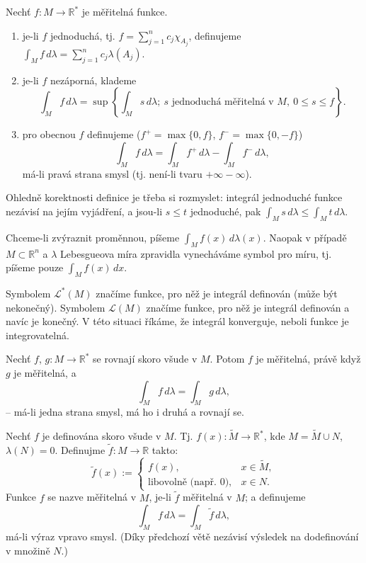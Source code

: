 \begin{definice}
Nechť $f : M \to \mathbb{R}^*$ je měřitelná funkce.
\begin{enumerate}[1.]
\item je-li $f$ jednoduchá, tj.
$f = \sum_{j=1}^n c_j \chi_{A_j}$, definujeme
$\int_M f \, d\lambda = \sum_{j=1}^n c_j \lambda(A_j)$.
\item je-li $f$ nezáporná, klademe
\[
\int_M f \, d\lambda = \sup \left\{ \int_M s \, d\lambda;
\ s \text{ jednoduchá měřitelná v } M, \ 0 \le s \le f \right\}.
\]
\item pro obecnou $f$ definujeme
($f^+ = \max\{0, f\}$, $f^- = \max\{0, -f\}$)
\[
\int_M f \, d\lambda = \int_M f^+ \, d\lambda - \int_M f^- \, d\lambda,
\]
má-li pravá strana smysl (tj. není-li tvaru $+\infty - \infty$).
\end{enumerate}
\end{definice}

\begin{poznamka}
Ohledně korektnosti definice je třeba si rozmyslet: integrál jednoduché
funkce nezávisí na jejím vyjádření, a jsou-li $s \le t$ jednoduché,
pak $\int_M s \, d\lambda \le \int_M t \, d\lambda$.
\end{poznamka}

\begin{poznamka}
Chceme-li zvýraznit proměnnou, píšeme $\int_M f(x) \, d\lambda(x)$.
Naopak v případě $M \subset \mathbb{R}^n$ a $\lambda$ Lebesgueova míra
zpravidla vynecháváme symbol pro míru, tj. píšeme pouze
$\int_M f(x) \, dx$.

Symbolem $\mathcal{L}^*(M)$ značíme funkce, pro něž je integrál
definován (může být nekonečný). Symbolem $\mathcal{L}(M)$ značíme
funkce, pro něž je integrál definován a navíc je konečný. V této
situaci říkáme, že integrál konverguje, neboli funkce je
integrovatelná.
\end{poznamka}

\begin{veta}
Nechť $f$, $g : M \to \mathbb{R}^*$ se rovnají skoro všude v $M$.
Potom $f$ je měřitelná, právě když $g$ je měřitelná, a
\[
\int_M f \, d\lambda = \int_M g \, d\lambda,
\]
-- má-li jedna strana smysl, má ho i druhá a rovnají se.
\end{veta}

\begin{definice}
Nechť $f$ je definována skoro všude v $M$. Tj.
$f(x) : \tilde{M} \to \mathbb{R}^*$, kde $M = \tilde{M} \cup N$,
$\lambda(N) = 0$. Definujme $\tilde{f} : M \to \mathbb{R}$ takto:
\[
\tilde{f}(x) := \begin{cases}
f(x), & x \in \tilde{M}, \\
\text{libovolně (např. } 0), & x \in N.
\end{cases}
\]
Funkce $f$ se nazve měřitelná v $M$, je-li $\tilde{f}$ měřitelná v $M$;
a definujeme
\[
\int_M f \, d\lambda = \int_M \tilde{f} \, d\lambda,
\]
má-li výraz vpravo smysl. (Díky předchozí větě nezávisí výsledek na
dodefinování v množině $N$.)
\end{definice}

